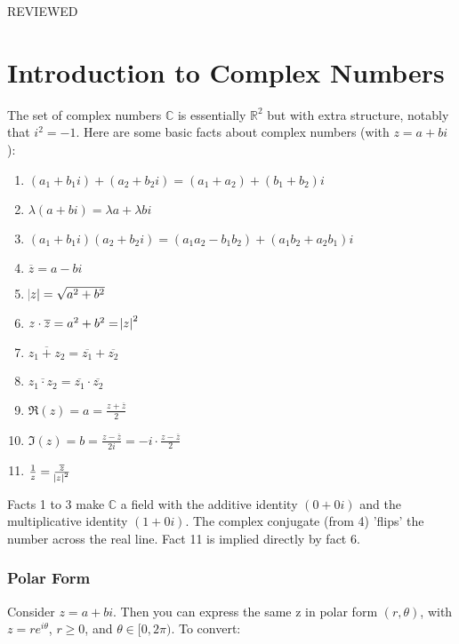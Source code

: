 \setcounter{section}{0}
\setcounter{theorem}{0}
REVIEWED

\section{Introduction to Complex Numbers}

The set of complex numbers $\mathbb{C}$ is essentially $\mathbb{R}^2$ but with extra structure, notably that $i^2=-1$. Here are some basic facts about complex numbers (with $z=a+bi$):

\begin{enumerate}
    \item $(a_1+b_1i)+(a_2+b_2i)=(a_1+a_2)+(b_1+b_2)i$
    \item $\lambda(a+bi)=\lambda a + \lambda b i$
    \item $(a_1+b_1i)(a_2+b_2i)=(a_1a_2-b_1b_2)+(a_1b_2+a_2b_1)i$
    \item $\overline{z}=a-bi$
    \item $\abs{z}=\sqrt{a^2+b^2}$
    \item $z \cdot \overline{z}=a^2+b^2= \abs{z}^2$
    \item $\overline{z_1+z_2}=\overline{z_1}+\overline{z_2}$
    \item $\overline{z_1 \cdot z_2} = \overline{z_1} \cdot \overline{z_2}$
    \item $\Re(z)=a=\frac{z+\overline{z}}{2}$
    \item $\Im(z) = b = \frac{z-\overline{z}}{2i} = -i\cdot\frac{z-\overline{z}}{2}$
    \item $\frac{1}{z} = \frac{\overline{z}}{\abs{z}^2}$
\end{enumerate}

Facts 1 to 3 make $\mathbb{C}$ a field with the additive identity $(0+0i)$ and the multiplicative identity $(1+0i)$. The complex conjugate (from 4) 'flips' the number across the real line. Fact 11 is implied directly by fact 6.

\subsubsection{Polar Form}

Consider $z=a+bi$. Then you can express the same z in polar form $(r,\theta)$, with $z= r e^{i\theta}$, $r\geq0$, and $\theta \in [0,2 \pi)$. To convert:


